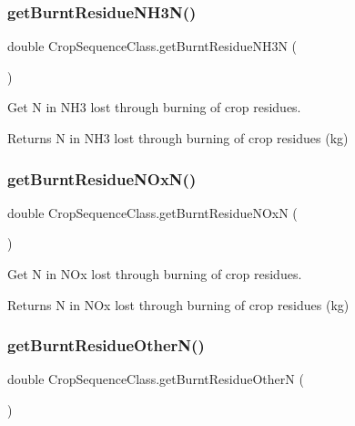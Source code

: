 \subsubsection{\texorpdfstring{getBurntResidueNH3N()}{getBurntResidueNH3N()}}
{\footnotesize\ttfamily double Crop\+Sequence\+Class.\+get\+Burnt\+Residue\+N\+H3N (\begin{DoxyParamCaption}{ }\end{DoxyParamCaption})\hspace{0.3cm}{\ttfamily [inline]}}



Get N in N\+H3 lost through burning of crop residues. 

\begin{DoxyReturn}{Returns}
N in N\+H3 lost through burning of crop residues (kg) 
\end{DoxyReturn}
\mbox{\label{class_crop_sequence_class_aa4fef8f3d81d98b8e5e6a0a18e67ff8b}} 
\subsubsection{\texorpdfstring{getBurntResidueNOxN()}{getBurntResidueNOxN()}}
{\footnotesize\ttfamily double Crop\+Sequence\+Class.\+get\+Burnt\+Residue\+N\+OxN (\begin{DoxyParamCaption}{ }\end{DoxyParamCaption})\hspace{0.3cm}{\ttfamily [inline]}}



Get N in N\+Ox lost through burning of crop residues. 

\begin{DoxyReturn}{Returns}
N in N\+Ox lost through burning of crop residues (kg) 
\end{DoxyReturn}
\mbox{\label{class_crop_sequence_class_ac1b7b6083a9f81c2c459697b5522f827}} 
\subsubsection{\texorpdfstring{getBurntResidueOtherN()}{getBurntResidueOtherN()}}
{\footnotesize\ttfamily double Crop\+Sequence\+Class.\+get\+Burnt\+Residue\+OtherN (\begin{DoxyParamCaption}{ }\end{DoxyParamCaption})\hspace{0.3cm}{\ttfamily [inline]}}



